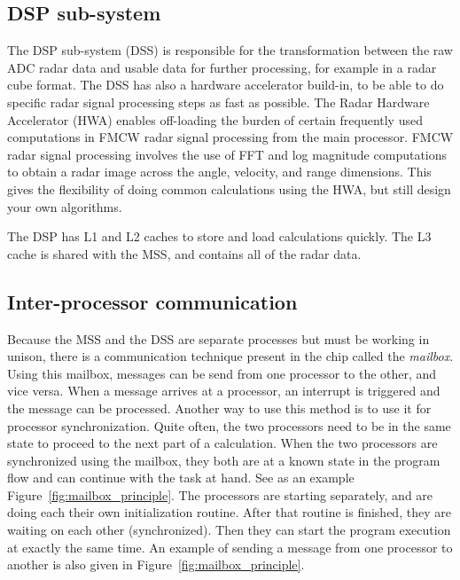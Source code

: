 \subsection{DSP sub-system}
The DSP sub-system (DSS) is responsible for the transformation between the raw ADC radar data and usable data for further processing, for example in a radar cube format. The DSS has also a hardware accelerator build-in, to be able to do specific radar signal processing steps as fast as possible. The Radar Hardware Accelerator (HWA) enables off-loading the burden of certain frequently
used computations in FMCW radar signal processing from the main processor. FMCW radar signal processing involves the use of FFT and log magnitude computations to obtain a radar image across the angle, velocity, and range dimensions. This gives the flexibility of doing common calculations using the HWA, but still design your own algorithms.

The DSP has L1 and L2 caches to store and load calculations quickly. The L3 cache is shared with the MSS, and contains all of the radar data. 

\subsection{Inter-processor communication}
Because the MSS and the DSS are separate processes but must be working in unison, there is a communication technique present in the chip called the \emph{mailbox}. Using this mailbox, messages can be send from one processor to the other, and vice versa. When a message arrives at a processor, an interrupt is triggered and the message can be processed. Another way to use this method is to use it for processor synchronization. Quite often, the two processors need to be in the same state to proceed to the next part of a calculation. When the two processors are synchronized using the mailbox, they both are at a known state in the program flow and can continue with the task at hand. See as an example Figure~\ref{fig:mailbox_principle}. The processors are starting separately, and are doing each their own initialization routine. After that routine is finished, they are waiting on each other (synchronized). Then they can start the program execution at exactly the same time. An example of sending a message from one processor to another is also given in Figure~\ref{fig:mailbox_principle}.


